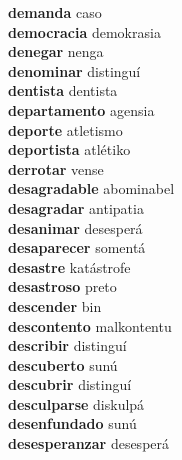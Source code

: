 \textbf{demanda } caso \\
\textbf{democracia } demokrasia \\
\textbf{denegar } nenga \\
\textbf{denominar } distinguí \\
\textbf{dentista } dentista \\
\textbf{departamento } agensia \\
\textbf{deporte } atletismo \\
\textbf{deportista } atlétiko \\
\textbf{derrotar } vense \\
\textbf{desagradable } abominabel \\
\textbf{desagradar } antipatia \\
\textbf{desanimar } desesperá \\
\textbf{desaparecer } somentá \\
\textbf{desastre } katástrofe \\
\textbf{desastroso } preto \\
\textbf{descender } bin \\
\textbf{descontento } malkontentu \\
\textbf{describir } distinguí \\
\textbf{descuberto } sunú \\
\textbf{descubrir } distinguí \\
\textbf{desculparse } diskulpá \\
\textbf{desenfundado } sunú \\
\textbf{desesperanzar } desesperá \\
